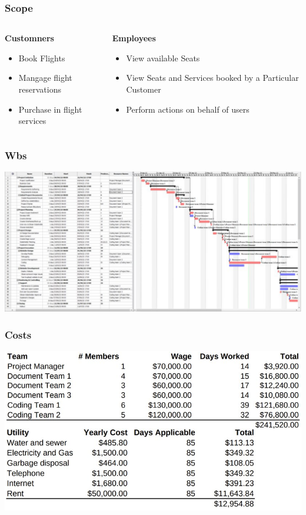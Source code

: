 \documentclass[12pt]{beamer}
\begin{document}
\begin{frame}[plain]
  \frametitle{Scope}
  \begin{columns}
    \begin{column}{0.5\textwidth}
      \textbf{Customners}
      \begin{itemize}
      \item Book Flights
      \item Mangage flight reservations
      \item Purchase in flight services
      \end{itemize}
    \end{column}
    \begin{column}{0.5\textwidth}
      \textbf{Employees}
      \begin{itemize}
      \item View available Seats
      \item View Seats and Services booked by a Particular Customer
      \item Perform actions on behalf of users
      \end{itemize}
    \end{column}
  \end{columns}
\end{frame}

\begin{frame}[plain]
  \frametitle{Wbs}
  \includegraphics[width=\textwidth]{wbs}
\end{frame}

\begin{frame}[plain]
  \frametitle{Costs}
  \includegraphics[width=\textwidth]{costs}
\end{frame}
\end{document}
